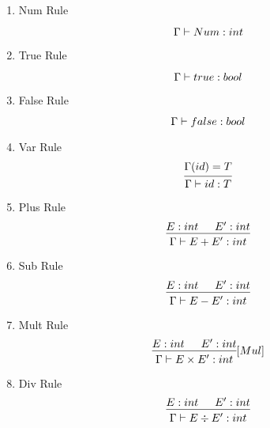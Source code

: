 \documentclass{scrreprt}
\begin{document}
\begin{multicols}{2}
\begin{enumerate}

    \item Num Rule
    \[
        \begin{prooftree}
            \infer [no rule] 0 {\Gamma \vdash Num: int}
        \end{prooftree} 
    \] 
    \item True Rule
    \[
        \begin{prooftree}
            \infer [no rule] 0 {\Gamma \vdash true: bool}
        \end{prooftree}
    \]
    \item False Rule
    \[
        \begin{prooftree}
            \infer [no rule] 0 {\Gamma \vdash false: bool}
        \end{prooftree}
    \]
    \item Var Rule
    \[
        \begin{prooftree}
            \hypo {\Gamma(id) = T}
            \infer 1 {\Gamma \vdash id: T}
        \end{prooftree}\\
    \]
    \item Plus Rule
        \[
            \begin{prooftree}
                \hypo {E : int}
                \hypo {E' : int}
                \infer 2 {\Gamma \vdash E + E' : int}
            \end{prooftree}
        \]
    \item Sub Rule
        \[
            \begin{prooftree}
                \hypo {E : int}
                \hypo {E' : int}
                \infer 2 {\Gamma \vdash E - E' : int}
            \end{prooftree}
        \]
    \item Mult Rule
        \[
            \begin{prooftree}
                \hypo {E : int}
                \hypo {E' : int}
                \infer 2 {\Gamma \vdash E \times E' : int}
            \end{prooftree} [Mul]
        \]
    \item Div Rule
        \[
            \begin{prooftree}
                \hypo {E : int}
                \hypo {E' : int}
                \infer 2 {\Gamma \vdash E \div E' : int}

\end{prooftree}\]
\end{enumerate}
\end{multicols}
\end{document}
